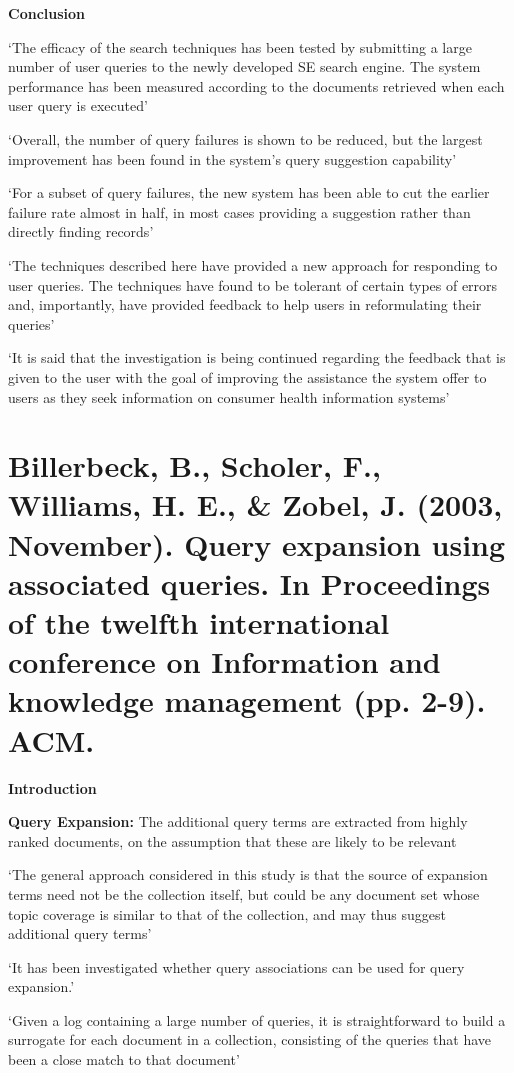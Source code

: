 \documentclass[]{article}
\begin{document}
{{\textbf{Conclusion}

‘The efficacy of the search techniques has been tested by submitting a large number of user queries to the newly developed SE search engine. The system performance has been measured according to the documents retrieved when each user query is executed’

‘Overall, the number of query failures is shown to be reduced, but the largest improvement has been found in the system’s query suggestion capability’

‘For a subset of query failures, the new system has been able to cut the earlier failure rate almost in half, in most cases providing a suggestion rather than directly finding records’

‘The techniques described here have provided a new approach for responding to user queries. The techniques have found to be tolerant of certain types of errors and, importantly,  have provided feedback to help users in reformulating their queries’

‘It is said that the investigation is being continued regarding the feedback that is given to the user with the goal of improving the assistance the system offer to users as they seek information on consumer health information systems’  

\section{Billerbeck, B., Scholer, F., Williams, H. E., & Zobel, J. (2003, November). Query expansion using associated queries. In Proceedings of the twelfth international conference on Information and knowledge management (pp. 2-9). ACM.}

\textbf{Introduction}

\textbf{Query Expansion:} The additional query terms are extracted from highly ranked documents, on the assumption that these are likely to be relevant

‘The general approach considered in this study is that the source of expansion terms need not be the collection itself, but could be any document set whose topic coverage is similar to that of the collection, and may thus suggest additional query terms’

‘It has been investigated whether query associations can be used for query expansion.’

‘Given a log containing a large number of queries, it is straightforward to build a surrogate for each document in a collection, consisting of the queries that have been a close match to that document’

}}
\end{document}
